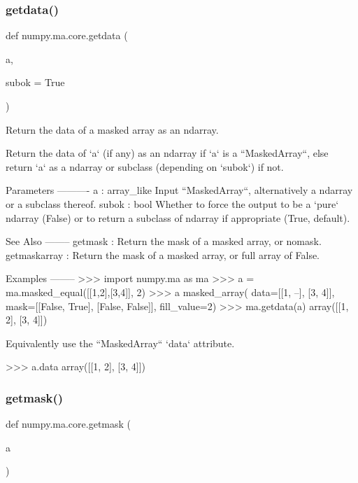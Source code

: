 \subsubsection{\texorpdfstring{getdata()}{getdata()}}
{\footnotesize\ttfamily def numpy.\+ma.\+core.\+getdata (\begin{DoxyParamCaption}\item[{}]{a,  }\item[{}]{subok = {\ttfamily True} }\end{DoxyParamCaption})}

\begin{DoxyVerb}Return the data of a masked array as an ndarray.

Return the data of `a` (if any) as an ndarray if `a` is a ``MaskedArray``,
else return `a` as a ndarray or subclass (depending on `subok`) if not.

Parameters
----------
a : array_like
    Input ``MaskedArray``, alternatively a ndarray or a subclass thereof.
subok : bool
    Whether to force the output to be a `pure` ndarray (False) or to
    return a subclass of ndarray if appropriate (True, default).

See Also
--------
getmask : Return the mask of a masked array, or nomask.
getmaskarray : Return the mask of a masked array, or full array of False.

Examples
--------
>>> import numpy.ma as ma
>>> a = ma.masked_equal([[1,2],[3,4]], 2)
>>> a
masked_array(
  data=[[1, --],
        [3, 4]],
  mask=[[False,  True],
        [False, False]],
  fill_value=2)
>>> ma.getdata(a)
array([[1, 2],
       [3, 4]])

Equivalently use the ``MaskedArray`` `data` attribute.

>>> a.data
array([[1, 2],
       [3, 4]])\end{DoxyVerb}
 \mbox{\label{namespacenumpy_1_1ma_1_1core_ad114e63ad545adf2ed6243f8a4e87934}} 
\subsubsection{\texorpdfstring{getmask()}{getmask()}}
{\footnotesize\ttfamily def numpy.\+ma.\+core.\+getmask (\begin{DoxyParamCaption}\item[{}]{a }\end{DoxyParamCaption})}


